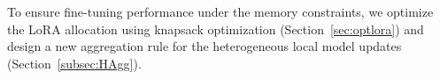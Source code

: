 \documentclass[sigconf]{acmart}
\newcommand*\circled[1]{\tikz[baseline=(char.base)]{
            \node[shape=circle,draw,inner sep=0.4pt] (char) {#1};}}
\begin{document}


To ensure fine-tuning performance under the memory constraints, we optimize the LoRA allocation using knapsack optimization (Section~\ref{sec:optlora}) and design a new aggregation rule for the heterogeneous local model updates (Section~\ref{subsec:HAgg}). 
\end{document}
